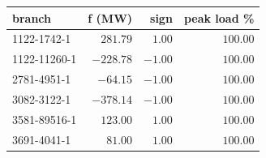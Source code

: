 \setlength{\tabcolsep}{3pt}\renewcommand{\arraystretch}{1.05}
\begin{tabular}{l|rrr}
{\tiny branch} & {\tiny f (MW)} & {\tiny sign} & {\tiny peak load \%} \tabularnewline \hline
{\tiny 1122-1742-1} & $281.79$ & $1.00$ & $100.00$\\
{\tiny 1122-11260-1} & $-228.78$ & $-1.00$ & $100.00$\\
{\tiny 2781-4951-1} & $-64.15$ & $-1.00$ & $100.00$\\
{\tiny 3082-3122-1} & $-378.14$ & $-1.00$ & $100.00$\\
{\tiny 3581-89516-1} & $123.00$ & $1.00$ & $100.00$\\
{\tiny 3691-4041-1} & $81.00$ & $1.00$ & $100.00$
\end{tabular}
